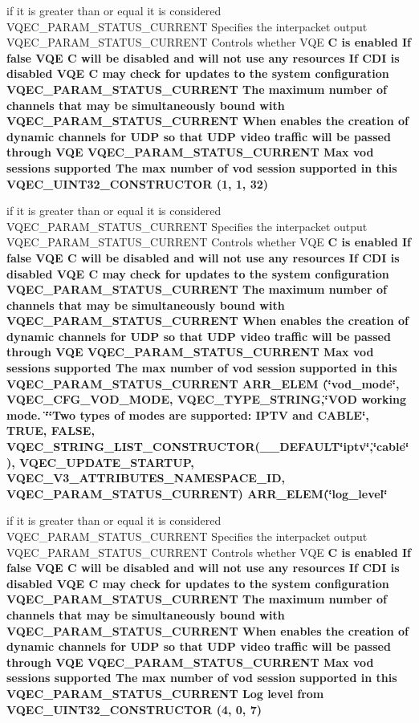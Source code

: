 \begin{CompactItemize}
\item 
if it is greater than or equal it is considered VQEC\_\-PARAM\_\-STATUS\_\-CURRENT Specifies the interpacket output VQEC\_\-PARAM\_\-STATUS\_\-CURRENT Controls whether VQE \bf{C} is enabled If false VQE \bf{C} will be disabled and will not use any resources If CDI is disabled VQE \bf{C} may check for updates \bf{to} the system configuration VQEC\_\-PARAM\_\-STATUS\_\-CURRENT The maximum number of \bf{channels} that may be simultaneously bound with VQEC\_\-PARAM\_\-STATUS\_\-CURRENT When enables the creation of dynamic \bf{channels} for UDP so that UDP video traffic will be passed through VQE VQEC\_\-PARAM\_\-STATUS\_\-CURRENT Max vod sessions supported The max number of vod session supported in \bf{this} \bf{VQEC\_\-UINT32\_\-CONSTRUCTOR} (1, 1, 32)
\item 
if it is greater than or equal it is considered VQEC\_\-PARAM\_\-STATUS\_\-CURRENT Specifies the interpacket output VQEC\_\-PARAM\_\-STATUS\_\-CURRENT Controls whether VQE \bf{C} is enabled If false VQE \bf{C} will be disabled and will not use any resources If CDI is disabled VQE \bf{C} may check for updates \bf{to} the system configuration VQEC\_\-PARAM\_\-STATUS\_\-CURRENT The maximum number of \bf{channels} that may be simultaneously bound with VQEC\_\-PARAM\_\-STATUS\_\-CURRENT When enables the creation of dynamic \bf{channels} for UDP so that UDP video traffic will be passed through VQE VQEC\_\-PARAM\_\-STATUS\_\-CURRENT Max vod sessions supported The max number of vod session supported in \bf{this} VQEC\_\-PARAM\_\-STATUS\_\-CURRENT \bf{ARR\_\-ELEM} (\char`\"{}vod\_\-mode\char`\"{}, VQEC\_\-CFG\_\-VOD\_\-MODE, \bf{VQEC\_\-TYPE\_\-STRING},\char`\"{}VOD working mode. \char`\"{}\char`\"{}Two types of modes are supported: IPTV and CABLE\char`\"{}, TRUE, \bf{FALSE}, VQEC\_\-STRING\_\-LIST\_\-CONSTRUCTOR(\_\-\_\-DEFAULT\char`\"{}iptv\char`\"{},\char`\"{}cable\char`\"{}), VQEC\_\-UPDATE\_\-STARTUP, \bf{VQEC\_\-V3\_\-ATTRIBUTES\_\-NAMESPACE\_\-ID}, VQEC\_\-PARAM\_\-STATUS\_\-CURRENT) ARR\_\-ELEM(\char`\"{}log\_\-level\char`\"{}
\item 
if it is greater than or equal it is considered VQEC\_\-PARAM\_\-STATUS\_\-CURRENT Specifies the interpacket output VQEC\_\-PARAM\_\-STATUS\_\-CURRENT Controls whether VQE \bf{C} is enabled If false VQE \bf{C} will be disabled and will not use any resources If CDI is disabled VQE \bf{C} may check for updates \bf{to} the system configuration VQEC\_\-PARAM\_\-STATUS\_\-CURRENT The maximum number of \bf{channels} that may be simultaneously bound with VQEC\_\-PARAM\_\-STATUS\_\-CURRENT When enables the creation of dynamic \bf{channels} for UDP so that UDP video traffic will be passed through VQE VQEC\_\-PARAM\_\-STATUS\_\-CURRENT Max vod sessions supported The max number of vod session supported in \bf{this} VQEC\_\-PARAM\_\-STATUS\_\-CURRENT Log level from \bf{VQEC\_\-UINT32\_\-CONSTRUCTOR} (4, 0, 7)

\end{CompactItemize}

